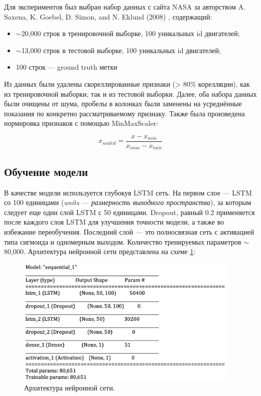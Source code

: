 \documentclass[14pt]{extarticle}
\begin{document}
Для экспериментов был выбран набор данных с сайта NASA за авторством A. Saxena, K. Goebel, D. Simon, and N. Eklund (2008) \cite{ML_1M}, содержащий:

\begin{itemize}
    \item $\sim$20,000 строк в тренировочной выборке, 100 уникальных id двигателей;
    \item $\sim$13,000 строк в тестовой выборке, 100 уникальных id двигателей;
    \item 100 строк --- ground truth метки
\end{itemize}

Из данных были удалены скореллированные признаки (> 80\% корелляции), как из тренировочной выборки, так и из тестовой выборки. Далее, оба набора данных были очищены от шума, пробелы в колонках были заменены на усреднённые показания по конкретно рассматриваемому признаку. Также была произведена нормировка признаков с помощью MinMaxScaler:

$$x_{scaled} = \frac{x - x_{min}}{x_{max} - x_{min}}$$ 




\subsection{Обучение модели}

В качестве модели используется глубокуя LSTM сеть. На первом слое --- LSTM со 100 единицами ({\it units --- размерность выходного пространства}), за которым следует еще один слой LSTM с 50 единицами. Dropout, равный $0.2$ применяется после каждого слоя LSTM для улучшения точности модели, а также во избежание переобучения. Последний слой --- это полносвязная сеть с активацией типа сигмоида и одномерным выходом. Количество тренируемых параметров $\sim$80,000. Архитектура нейронной сети представлена на схеме \ref{fig:lstm-arch}:

\begin{figure}[h]
	\centering
	\includegraphics[width=0.95\textwidth]{img/nn_structure2.png}
	\caption{Архитектура нейронной сети.}
	\label{fig:lstm-arch}
\end{figure}
\end{document}
